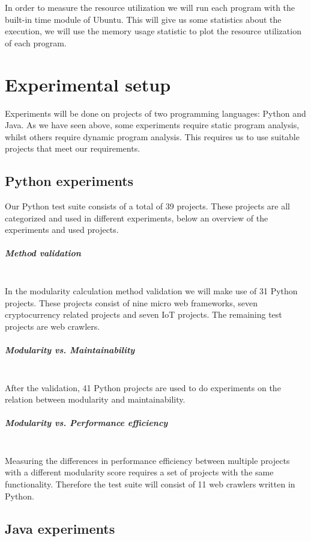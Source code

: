 \documentclass[twoside]{uva-inf-bachelor-thesis}
\newcommand{\myparagraph}[1]{\paragraph{#1}\mbox{}\\}
\begin{document}
In order to measure the resource utilization we will run each program with the built-in time module of Ubuntu. This will give us some statistics about the execution, we will use the memory usage statistic to plot the resource utilization of each program.

\chapter{Experimental setup}
Experiments will be done on projects of two programming languages: Python and Java. As we have seen above, some experiments require static program analysis, whilst others require dynamic program analysis. This requires us to use suitable projects that meet our requirements.

\section{Python experiments}
Our Python test suite consists of a total of 39 projects. These projects are all categorized and used in different experiments, below an overview of the experiments and used projects.

\myparagraph{Method validation}
In the modularity calculation method validation we will make use of 31 Python projects. These projects consist of nine micro web frameworks, seven cryptocurrency related projects and seven IoT projects. The remaining test projects are web crawlers.

\myparagraph{Modularity vs. Maintainability}
After the validation, 41 Python projects are used to do experiments on the relation between modularity and maintainability.

\myparagraph{Modularity vs. Performance efficiency}
Measuring the differences in performance efficiency between multiple projects with a different modularity score requires a set of projects with the same functionality. Therefore the test suite will consist of 11 web crawlers written in Python.

\section{Java experiments}
\end{document}
